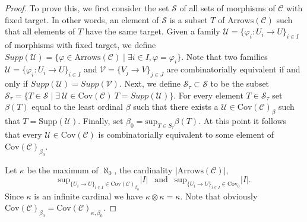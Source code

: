 \begin{proof}
To prove this, we first consider the set $\mathcal{S}$ of all
sets of morphisms of $\mathcal{C}$ with fixed target.
In other words, an element of $\mathcal{S}$ is a subset $T$
of $\text{Arrows}(\mathcal{C})$ such that all
elements of $T$ have the same target. Given a family
$\mathcal{U} = \{\varphi_i : U_i \to U\}_{i\in I}$ of morphisms with fixed
target, we define
$Supp(\mathcal{U}) = \{ \varphi \in \text{Arrows}(\mathcal{C})
\mid \exists i\in I, \varphi = \varphi_i\}$.
Note that two families $\mathcal{U} =  \{\varphi_i : U_i \to U\}_{i\in I}$
and $\mathcal{V} = \{V_j \to V\}_{j \in J}$ are combinatorially
equivalent if and only if $Supp(\mathcal{U}) = Supp(\mathcal{V})$.
Next, we define
$\mathcal{S}_\tau \subset \mathcal{S}$ to be the subset
$\mathcal{S}_\tau = \{ T \in \mathcal{S} \mid
\exists\ \mathcal{U} \in \text{Cov}(\mathcal{C}) \ T = Supp(\mathcal{U})\}$.
For every element $T \in \mathcal{S}_\tau$ set
$\beta(T)$ equal to the least ordinal $\beta$ such that
there exists a $\mathcal{U} \in \text{Cov}(\mathcal{C})_\beta$
such that $T = \text{Supp}(\mathcal{U})$. Finally, set
$\beta_0 = \text{sup}_{T \in S_\tau} \beta(T)$.
At this point it follows that every $\mathcal{U} \in \text{Cov}(\mathcal{C})$
is combinatorially equivalent to some element
of $\text{Cov}(\mathcal{C})_{\beta_0}$.

\medskip\noindent
Let $\kappa$ be the maximum of $\aleph_0$,
the cardinality $|\text{Arrows}(\mathcal{C})|$,
$$
\text{sup}_{\{U_i \to U\}_{i\in I} \in \text{Cov}(\mathcal{C})_{\beta_0}} |I|
\ \ \text{ and }\ \ 
\text{sup}_{\{U_i \to U\}_{i\in I} \in \text{Cov}_0} |I|.
$$
Since $\kappa$ is an infinite cardinal we have
$\kappa \otimes \kappa = \kappa$. Note that obviously
$\text{Cov}(\mathcal{C})_{\beta_0} =
\text{Cov}(\mathcal{C})_{\kappa, \beta_0}$.


\end{proof}
